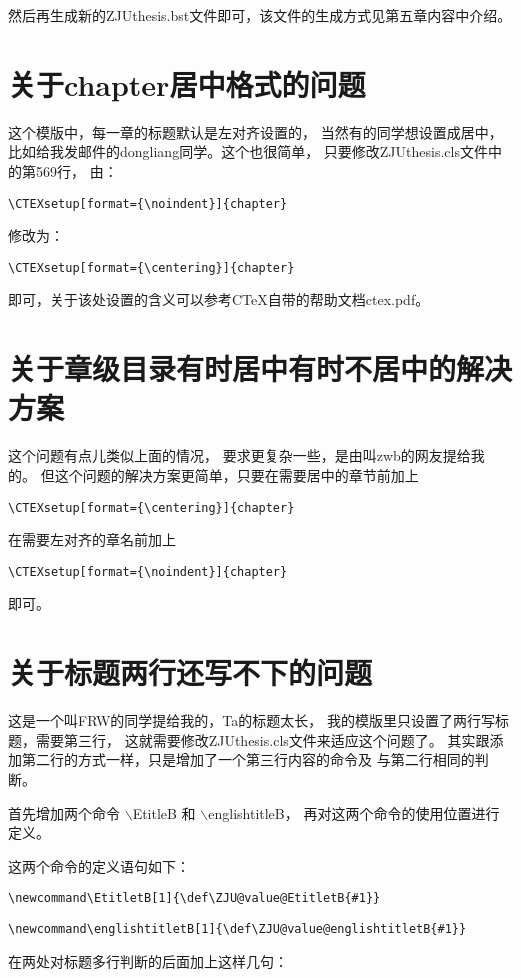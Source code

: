 然后再生成新的ZJUthesis.bst文件即可，该文件的生成方式见第五章内容中介绍。

\section{关于chapter居中格式的问题}

这个模版中，每一章的标题默认是左对齐设置的，
当然有的同学想设置成居中，比如给我发邮件的dongliang同学。这个也很简单，
只要修改ZJUthesis.cls文件中的第569行，
由：

{
\verb+\CTEXsetup[format={\noindent}]{chapter}+
}

修改为：

{
\verb+\CTEXsetup[format={\centering}]{chapter}+
}

即可，关于该处设置的含义可以参考CTeX自带的帮助文档ctex.pdf。


\section{关于章级目录有时居中有时不居中的解决方案}

这个问题有点儿类似上面的情况，
要求更复杂一些，是由叫zwb的网友提给我的。
但这个问题的解决方案更简单，只要在需要居中的章节前加上

{
\verb+\CTEXsetup[format={\centering}]{chapter}+
}

在需要左对齐的章名前加上

{
\verb+\CTEXsetup[format={\noindent}]{chapter}+
}

即可。


\section{关于标题两行还写不下的问题}

这是一个叫FRW的同学提给我的，Ta的标题太长，
我的模版里只设置了两行写标题，需要第三行，
这就需要修改ZJUthesis.cls文件来适应这个问题了。
其实跟添加第二行的方式一样，只是增加了一个第三行内容的命令及
与第二行相同的判断。

首先增加两个命令
$\backslash$EtitleB 和 $\backslash$englishtitleB，
再对这两个命令的使用位置进行定义。

这两个命令的定义语句如下：

{
\verb+\newcommand\EtitletB[1]{\def\ZJU@value@EtitletB{#1}}+

\verb+\newcommand\englishtitletB[1]{\def\ZJU@value@englishtitletB{#1}}+
}

在两处对标题多行判断的后面加上这样几句：

